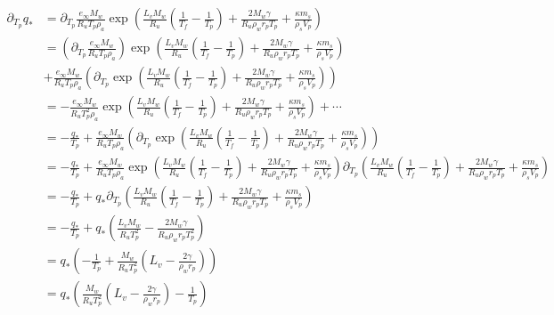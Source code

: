 \documentclass{article}
\begin{document}
\begin{align*}
    \partial_{T_{p}}q_* &= \partial_{T_{p}} \frac{e_{\infty} M_{w}}{R_{u} T_{p}\rho_{a}}
          			\exp\left(\frac{L_{v}M_{w}}{R_{u}}\left(\frac{1}{T_{f}}-\frac{1}{T_{p}}\right)
			      + \frac{2M_{w}\gamma}{R_{u}\rho_w r_{p}T_{p}}
		              + \frac{\kappa m_{s}}{\rho_{s}V_{p}}\right)\\
    			&= \left(\partial_{T_{p}}\frac{e_{\infty} M_{w}}{R_{u} T_{p}\rho_{a}}\right)
			   \exp\left(\frac{L_{v}M_{w}}{R_{u}}\left(\frac{1}{T_{f}}-\frac{1}{T_{p}}\right)
		         + \frac{2M_{w}\gamma}{R_{u}\rho_w r_{p}T_{p}}
		         + \frac{\kappa m_{s}}{\rho_{s}V_{p}}\right)\\
    			&+ \frac{e_{\infty} M_{w}}{R_{u} T_{p}\rho_{a}}\left(\partial_{T_{p}}
			   \exp\left(\frac{L_{v}M_{w}}{R_{u}}\left(\frac{1}{T_{f}}-\frac{1}{T_{p}}\right)
		                   + \frac{2M_{w}\gamma}{R_{u}\rho_w r_{p}T_{p}}
		                   + \frac{\kappa m_{s}}{\rho_{s}V_{p}}\right)\right)\\
    			&= -\frac{e_{\infty} M_{w}}{R_{u} T_{p}^2\rho_{a}}
			        \exp\left(\frac{L_{v}M_{w}}{R_{u}}\left(\frac{1}{T_{f}}-\frac{1}{T_{p}}\right)
				        + \frac{2M_{w}\gamma}{R_{u}\rho_w r_{p}T_{p}}
				        + \frac{\kappa m_{s}}{\rho_{s}V_{p}}\right) + \cdots\\ 
    			&= -\frac{q_*}{T_{p}} + \frac{e_{\infty} M_{w}}{R_{u} T_{p}\rho_{a}}\left(\partial_{T_{p}}
			        \exp\left(\frac{L_{v}M_{w}}{R_{u}}\left(\frac{1}{T_{f}}-\frac{1}{T_{p}}\right)
		                        + \frac{2M_{w}\gamma}{R_{u}\rho_w r_{p}T_{p}}
			                + \frac{\kappa m_{s}}{\rho_{s}V_{p}}\right)\right)\\
    			&= -\frac{q_*}{T_{p}} + \frac{e_{\infty} M_{w}}{R_{u} T_{p}\rho_{a}}
			    \exp\left(\frac{L_{v}M_{w}}{R_{u}}\left(\frac{1}{T_{f}}-\frac{1}{T_{p}}\right)
			            + \frac{2M_{w}\gamma}{R_{u}\rho_w r_{p}T_{p}}
			            + \frac{\kappa m_{s}}{\rho_{s}V_{p}}\right)
			    \partial_{T_{p}}\left(\frac{L_{v}M_{w}}{R_{u}}\left(\frac{1}{T_{f}}-\frac{1}{T_{p}}\right)
			  + \frac{2M_{w}\gamma}{R_{u}\rho_w r_{p}T_{p}}
		          + \frac{\kappa m_{s}}{\rho_{s}V_{p}}\right)\\
    			&= -\frac{q_*}{T_{p}}
			 + q_*\partial_{T_{p}}\left(\frac{L_{v}M_{w}}{R_{u}}\left(\frac{1}{T_{f}}-\frac{1}{T_{p}}\right)
			 + \frac{2M_{w}\gamma}{R_{u}\rho_w r_{p}T_{p}} + \frac{\kappa m_{s}}{\rho_{s}V_{p}}\right)\\
    			&= -\frac{q_*}{T_{p}}
			 + q_*\left(\frac{L_{v}M_{w}}{R_{u}T_{p}^2}
			 - \frac{2M_{w}\gamma}{R_{u}\rho_w r_{p}T_{p}^2}\right)\\
    			&= q_*\left(-\frac{1}{T_{p}}
			+ \frac{M_{w}}{R_{u}T_{p}^2}\left(L_{v}
		        - \frac{2\gamma}{\rho_{w} r_{p}}\right)\right)\\
    			&= q_*\left(\frac{M_{w}}{R_{u}T_{p}^2}\left(L_{v}- \frac{2\gamma}{\rho_w r_{p}}\right)-\frac{1}{T_{p}}\right)\\
\end{align*}
\end{document}
